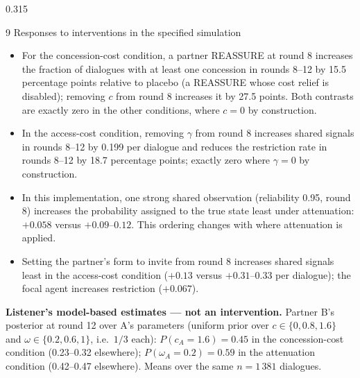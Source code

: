 \documentclass[final,t]{beamer}
\begin{document}
\begin{frame}[t]
\begin{columns}[t,totalwidth=0.965\paperwidth]
\begin{column}{0.315\textwidth}
\begin{block}{9 \; Responses to interventions in the specified simulation}
\small\begin{itemize}\setlength{\itemsep}{1pt}
\item For the concession-cost condition, a partner REASSURE at round 8 increases the fraction of dialogues with at least one concession in rounds 8--12 by 15.5 percentage points relative to placebo (a REASSURE whose cost relief is disabled); removing $c$ from round 8 increases it by 27.5 points. Both contrasts are exactly zero in the other conditions, where $c=0$ by construction.
\item In the access-cost condition, removing $\gamma$ from round 8 increases shared signals in rounds 8--12 by 0.199 per dialogue and reduces the restriction rate in rounds 8--12 by 18.7 percentage points; exactly zero where $\gamma=0$ by construction.
\item In this implementation, one strong shared observation (reliability 0.95, round 8) increases the probability assigned to the true state least under attenuation: $+0.058$ versus $+0.09$--$0.12$. This ordering changes with where attenuation is applied.
\item Setting the partner's form to invite from round 8 increases shared signals least in the access-cost condition ($+0.13$ versus $+0.31$--$0.33$ per dialogue); the focal agent increases restriction ($+0.067$).
\end{itemize}
\smallskip\textbf{Listener's model-based estimates --- not an intervention.} Partner B's posterior at round 12 over A's parameters (uniform prior over $c\in\{0,0.8,1.6\}$ and $\omega\in\{0.2,0.6,1\}$, i.e.\ $1/3$ each): $P(c_A{=}1.6)=0.45$ in the concession-cost condition (0.23--0.32 elsewhere); $P(\omega_A{=}0.2)=0.59$ in the attenuation condition (0.42--0.47 elsewhere). Means over the same $n=1\,381$ dialogues.
\end{block}



\end{column}
\end{columns}
\end{frame}
\end{document}
